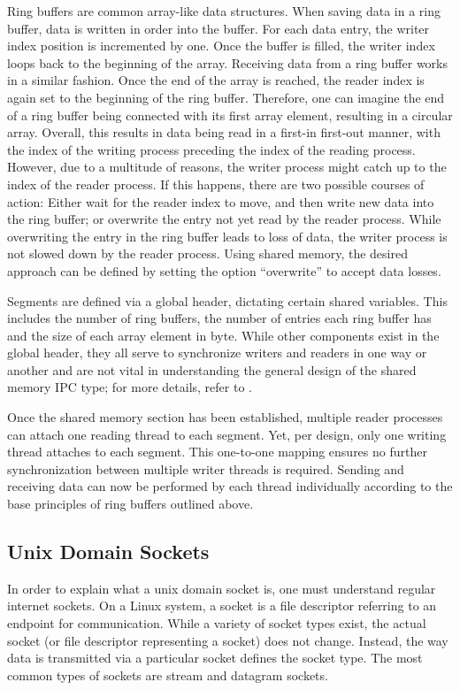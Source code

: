 Ring buffers are common array-like data structures.
When saving data in a ring buffer, data is written in order into the buffer.
For each data entry, the writer index position is incremented by one.
Once the buffer is filled, the writer index loops back to the beginning of the array.
Receiving data from a ring buffer works in a similar fashion.
Once the end of the array is reached, the reader index is again set to the beginning of the ring buffer.
Therefore, one can imagine the end of a ring buffer being connected with its first array element, resulting in a circular array.
Overall, this results in data being read in a first-in first-out manner, with the index of the writing process preceding the index of the reading process.
However, due to a multitude of reasons, the writer process might catch up to the index of the reader process.
If this happens, there are two possible courses of action:
Either wait for the reader index to move, and then write new data into the ring buffer; or overwrite the entry not yet read by the reader process.
While overwriting the entry in the ring buffer leads to loss of data, the writer process is not slowed down by the reader process.
Using shared memory, the desired approach can be defined by setting the option ``overwrite'' to accept data losses\cite{raatschen:ipc}.

Segments are defined via a global header, dictating certain shared variables.
This includes the number of ring buffers, the number of entries each ring buffer has and the size of each array element in byte.
While other components exist in the global header, they all serve to synchronize writers and readers in one way or another and are not vital in understanding the general design of the shared memory \ac{IPC} type; for more details, refer to \cite{raatschen:ipc}.

Once the shared memory section has been established, multiple reader processes can attach one reading thread to each segment.
Yet, per design, only one writing thread attaches to each segment.
This one-to-one mapping ensures no further synchronization between multiple writer threads is required.
Sending and receiving data can now be performed by each thread individually according to the base principles of ring buffers outlined above.

\subsection{Unix Domain Sockets}
\label{cha:UnixDomainSockets}
In order to explain what a unix domain socket is, one must understand regular internet sockets.
On a Linux system, a socket is a file descriptor referring to an endpoint for communication\cite{man:sockets}.
While a variety of socket types exist, the actual socket (or file descriptor representing a socket) does not change.
Instead, the way data is transmitted via a particular socket defines the socket type.
The most common types of sockets are stream and datagram sockets.


